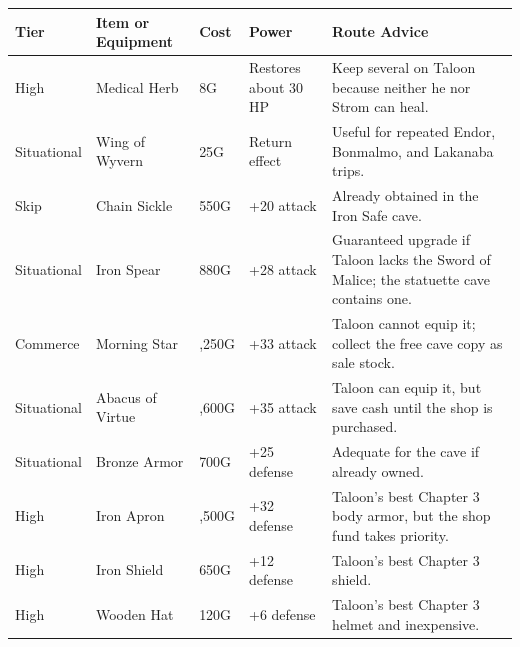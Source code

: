 \documentclass[
  american,
  10pt,
  letterpaper,
  oneside,
  open=any]{scrreprt}
\newcounter{none} %
\newenvironment{guidetable}{%
  \small\setstretch{1.0}%
  \setlength{\tabcolsep}{4pt}%
  \setlength{\LTpre}{8pt}\setlength{\LTpost}{10pt}%
  \renewcommand{\arraystretch}{1.16}%
}{ }
\begin{document}
\begin{guidetable}

{\def\LTcaptype{none} %
\begin{longtable}[]{@{}
  >{\raggedright\arraybackslash}p{}
  >{\raggedright\arraybackslash}p{}
  >{\raggedleft\arraybackslash}p{}
  >{\raggedleft\arraybackslash}p{}
  >{\raggedright\arraybackslash}p{}@{}}
\toprule\noalign{}
\begin{minipage}[b]{\linewidth}\raggedright
\color{GuideGreen}\bfseries Tier
\end{minipage} & \begin{minipage}[b]{\linewidth}\raggedright
\color{GuideGreen}\bfseries Item or Equipment
\end{minipage} & \begin{minipage}[b]{\linewidth}\raggedleft
\color{GuideGreen}\bfseries Cost
\end{minipage} & \begin{minipage}[b]{\linewidth}\raggedleft
\color{GuideGreen}\bfseries Power
\end{minipage} & \begin{minipage}[b]{\linewidth}\raggedright
\color{GuideGreen}\bfseries Route Advice
\end{minipage} \\
\midrule\noalign{}
\endhead
\bottomrule\noalign{}
\endlastfoot
High & Medical Herb & 8G & Restores about 30 HP & Keep several on Taloon
because neither he nor Strom can heal. \\
Situational & Wing of Wyvern & 25G & Return effect & Useful for repeated
Endor, Bonmalmo, and Lakanaba trips. \\
Skip & Chain Sickle & 550G & +20 attack & Already obtained in the Iron
Safe cave. \\
Situational & Iron Spear & 880G & +28 attack & Guaranteed upgrade if
Taloon lacks the Sword of Malice; the statuette cave contains one. \\
Commerce & Morning Star & 1,250G & +33 attack & Taloon cannot equip it;
collect the free cave copy as sale stock. \\
Situational & Abacus of Virtue & 1,600G & +35 attack & Taloon can equip
it, but save cash until the shop is purchased. \\
Situational & Bronze Armor & 700G & +25 defense & Adequate for the cave
if already owned. \\
High & Iron Apron & 1,500G & +32 defense & Taloon's best Chapter 3 body
armor, but the shop fund takes priority. \\
High & Iron Shield & 650G & +12 defense & Taloon's best Chapter 3
shield. \\
High & Wooden Hat & 120G & +6 defense & Taloon's best Chapter 3 helmet
and inexpensive. \\
\end{longtable}
}

\end{guidetable}
\end{document}
